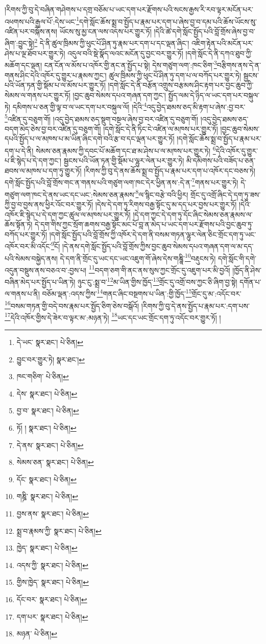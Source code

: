 །རིགས་ཀྱི་བུ་དེ་བཞིན་གཤེགས་པ་དགྲ་བཅོམ་པ་ཡང་དག་པར་རྫོགས་པའི་སངས་རྒྱས་རི་རབ་ལྟར་མངོན་པར་འཕགས་པའི་རྒྱལ་པོ་:དེས་ཡང་\footnote{དེ་ཡང་  སྣར་ཐང་།  པེ་ཅིན། }དགེ་སློང་ཆོས་སྨྲ་བ་སྤྱོད་པ་རྣམ་པར་དག་པ་ཞེས་བྱ་བ་དམ་པའི་ཆོས་ཡོངས་སུ་འཛིན་པར་བསྐོས་ནས། ཡོངས་སུ་མྱ་ངན་ལས་འདས་པར་གྱུར་ཏོ། །དེའི་ཚེ་དགེ་སློང་སྤྱོད་པའི་བློ་གྲོས་ཞེས་བྱ་བ་ཞིག་:བྱུང་སྟེ།\footnote{བྱུང་བར་གྱུར་ཏེ།  སྣར་ཐང་། } དེ་ནི་ཚུལ་ཁྲིམས་ཀྱི་ཕུང་པོ་ཤིན་ཏུ་རྣམ་པར་དག་པ་དང་ལྡན་ཞིང་། འཇིག་རྟེན་པའི་མངོན་པར་ཤེས་པ་ལྔ་ཐོབ་པར་གྱུར་ཏེ། འདུལ་བའི་སྡེ་སྣོད་ལའང་མངོན་དུ་བྱང་བར་གྱུར་ཏོ། །དགེ་སློང་དེ་ནི་དཀའ་ཐུབ་ཀྱི་མཆོག་དང་ལྡན། ངན་ངོན་ལ་མོས་པ་འཁོར་གྱི་ནང་ན་སྤྱོད་པ་སྟེ། དེས་གཙུག་ལག་:ཁང་ཅིག་\footnote{ཁང་གཅིག་  པེ་ཅིན། }བརྩིགས་ནས་དེ་ན་གནས་ཤིང་དེའི་འཁོར་དུ་གྱུར་པ་རྣམས་ཀྱང་། ཚུལ་ཁྲིམས་ཀྱི་ཕུང་པོ་ཤིན་ཏུ་དག་པ་ལ་བཀོད་པར་གྱུར་ཏེ། སྦྱངས་པའི་ཡོན་ཏན་གྱི་སྡོམ་པ་ལ་མོས་པར་གྱུར་ཏོ། །དགེ་སློང་དེ་ནི་བརྩོན་འགྲུས་བརྩམས་ཤིང་རྟག་པར་བྱང་ཆུབ་ཀྱི་སེམས་ལ་གནས་པར་གྱུར་ཏོ། །བྱང་ཆུབ་སེམས་དཔའ་གཞན་དག་ཀྱང་། སྤྱོད་ལམ་དེ་ཉིད་ལ་ཡང་དག་པར་བསྐུལ་ཏེ། དམིགས་པ་ཅན་གྱི་ལྟ་བ་ལ་ཡང་དག་པར་བསྐུལ་ལོ། །དེའི་\footnote{དེས་  སྣར་ཐང་།  པེ་ཅིན། }འདུ་བྱེད་ཐམས་ཅད་མི་རྟག་པ་ཞེས་:བྱ་བར་\footnote{བྱ་བ་  སྣར་ཐང་།  པེ་ཅིན། }འཛིན་དུ་བཅུག་གོ། །འདུ་བྱེད་ཐམས་ཅད་སྡུག་བསྔལ་ཞེས་བྱ་བར་འཛིན་དུ་བཅུག་གོ། །འདུ་བྱེད་ཐམས་ཅད་བདག་མེད་ཅེས་བྱ་བར་འཛིན་དུ་བཅུག་གོ། །དགེ་སློང་དེ་ནི་ཏིང་ངེ་འཛིན་ལ་མཁས་པར་གྱུར་ཏོ། །བྱང་ཆུབ་སེམས་དཔའི་སྤྱོད་པ་ལ་མཁས་པ་མ་ཡིན་ཞིང་དགེ་བའི་རྩ་བ་དང་ལྡན་པར་གྱུར་ཏོ། །དགེ་སློང་ཆོས་སྨྲ་བ་སྤྱོད་པ་རྣམ་པར་དག་པ་དེ་ནི། སེམས་ཅན་རྣམས་ཀྱི་དབང་པོ་མཆོག་དང་ཐ་མ་ཤེས་པ་ལ་མཁས་པར་གྱུར་ཏེ། \footnote{ཏོ། །   སྣར་ཐང་།  པེ་ཅིན། }དེའི་འཁོར་དུ་གྱུར་པ་ཇི་སྙེད་པ་དེ་དག་ཀྱང་། སྦྱངས་པའི་ཡོན་ཏན་གྱི་སྡོམ་པ་ལྷུར་ལེན་པར་གྱུར་ཏེ། མི་དམིགས་པའི་བཟོད་པ་ཅན་ཐབས་ལ་མཁས་པ་དག་ཏུ་གྱུར་ཏོ། །རིགས་ཀྱི་བུ་དེ་ནས་ཆོས་སྨྲ་བ་སྤྱོད་པ་རྣམ་པར་དག་པ་འཁོར་དང་བཅས་ཏེ། དགེ་སློང་སྤྱོད་པའི་བློ་གྲོས་གང་ན་གནས་པའི་གཙུག་ལག་ཁང་དེར་ཕྱིན་ནས་:དེ་ན་\footnote{དེ་ནས་  སྣར་ཐང་།  པེ་ཅིན། }གནས་པར་གྱུར་ཏེ། དེ་གཙུག་ལག་ཁང་དེ་ནས་ཡང་དང་ཡང་:སེམས་ཅན་རྣམས་\footnote{སེམས་ཅན་  སྣར་ཐང་།  པེ་ཅིན། }ལ་སྙིང་བརྩེ་བའི་ཕྱིར། གྲོང་དུ་འགྲོ་ཞིང་དེ་དག་ཏུ་ཟས་ཀྱི་བྱ་བ་བྱས་ནས་ཕྱིར་འོང་བར་གྱུར་ཏོ། །དེས་དེ་དག་ཏུ་རིགས་བརྒྱ་སྟོང་དུ་མ་དད་པར་བྱས་པར་གྱུར་ཏོ། །དེའི་འཁོར་ཇི་སྙེད་པ་དེ་དག་ཀྱང་ཚུལ་ལ་མཁས་པར་གྱུར་ཏོ། །དེ་དག་ཀྱང་དེ་དག་ཏུ་དོང་ཞིང་སེམས་ཅན་རྣམས་ལ་ཆོས་སྟོན་ཏེ། དེ་དག་གིས་ཀྱང་སྲོག་ཆགས་བརྒྱ་སྟོང་མང་པོ་བླ་ན་མེད་པ་ཡང་དག་པར་རྫོགས་པའི་བྱང་ཆུབ་ཏུ་བཀོད་པར་གྱུར་ཏོ། །དགེ་སློང་སྤྱོད་པའི་བློ་གྲོས་ཀྱི་འཁོར་དེ་དག་ནི་བསམ་གཏན་ལྷུར་ལེན་ཅིང་གྲོང་དག་ཏུ་ཡང་འཁོར་བར་མི་འདོང་\footnote{དོང་  སྣར་ཐང་།  པེ་ཅིན། }ངོ། །དེ་ནས་དགེ་སློང་སྤྱོད་པའི་བློ་གྲོས་ཀྱིས་བྱང་ཆུབ་སེམས་དཔའ་གཞན་དག་ལ་མ་དད་པའི་སེམས་བསྐྱེད་ནས། དེ་དག་ནི་གྲོང་དུ་ཡང་དང་ཡང་འཇུག་གོ་ཞེས་དེས་གཎྜཱི་\footnote{གཎྜི་  སྣར་ཐང་།  པེ་ཅིན། }བརྡུངས་ཏེ། དགེ་སློང་གི་དགེ་འདུན་བསྡུས་ནས་བཅའ་བ་:བྱས་པ། \footnote{བྱས་ནས་  སྣར་ཐང་།  པེ་ཅིན། }བདག་ཅག་གི་ནང་ནས་སུས་ཀྱང་གྲོང་དུ་འཇུག་པར་མི་བྱའོ། །ཁྱོད་ནི་ཤེས་བཞིན་མེད་པར་སྤྱོད་པ་ཡིན་ཏེ། ཉུང་ངུ་:སྨྲ་བ་\footnote{སྨྲ་བ་རྣམས་ཀྱི་  སྣར་ཐང་།  པེ་ཅིན། }མ་ཡིན་གྱིས་ཁྱོད་\footnote{ཁྱེད་  སྣར་ཐང་།  པེ་ཅིན། }གྲོང་དུ་འགྲོ་བས་ཀྱང་ཅི་ཞིག་བྱ་སྟེ། དགོན་པ་ལ་གནས་པ་ནི། བཅོམ་ལྡན་:འདས་ཀྱིས་\footnote{འདས་ཀྱི་  སྣར་ཐང་།  པེ་ཅིན། }གནང་ཞིང་བསྔགས་པ་ཡིན་:གྱི་ཁྱོད་\footnote{གྱིས་ཁྱེད་  སྣར་ཐང་།  པེ་ཅིན། }གྲོང་དུ་མ་:འདོང་བར་\footnote{དོང་བར་  སྣར་ཐང་།  པེ་ཅིན། }བསམ་གཏན་གྱི་བདེ་བས་རྣམ་པར་སྤྱོད་ཅིག་ཅེས་བསྒོའོ། །རིགས་ཀྱི་བུ་དེ་ནས་སྤྱོད་པ་རྣམ་པར་:དག་པས་\footnote{དག་པར་  སྣར་ཐང་།  པེ་ཅིན། }དེའི་འཁོར་གྱིས་དེ་ཟེར་བ་ལྟར་མ་:མཉན་ཏེ། \footnote{མཉན་  པེ་ཅིན། }ཡང་དང་ཡང་གྲོང་དག་ཏུ་འདོང་བར་གྱུར་ཏོ། །
